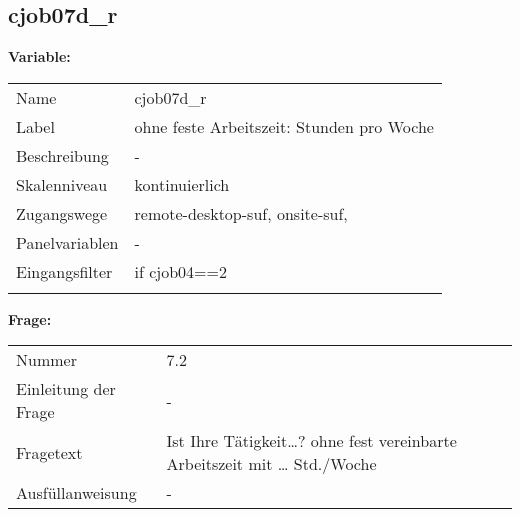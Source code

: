 	
	
	\subsection{cjob07d\_r}
	\label{subSection:cjob07d_r}

	\noindent\textbf{Variable:}\\
		\begin{tabular}{lL{11.3cm}}
			\label{tableVariable:cjob07d_r}
			Name & cjob07d\_r \\
			Label & ohne feste Arbeitszeit: Stunden pro Woche \\
			Beschreibung & - \\
			Skalenniveau & kontinuierlich \\
			Zugangswege &
				remote-desktop-suf,
				onsite-suf,
 \\
			Panelvariablen & -
			 \\
			Eingangsfilter & if cjob04==2 \\
 \\
		\end{tabular}

		\vspace*{1 cm}
		\noindent\textbf{Frage:}\\
		\begin{tabular}{lL{11.3cm}}
			\label{tableQuestion:cjob07d_r}
			Nummer & 7.2 \\
			Einleitung der Frage & - \\
			Fragetext & Ist Ihre Tätigkeit…?
ohne fest vereinbarte Arbeitszeit mit … Std./Woche \\
			Ausfüllanweisung & - \\
		\end{tabular}




